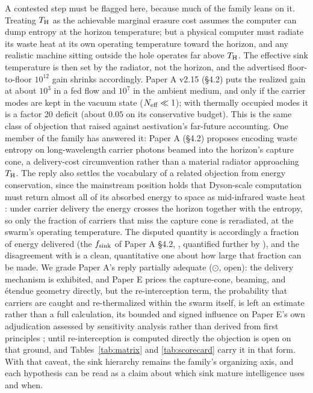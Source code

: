 \documentclass[11pt]{article}
\newcommand{\shalf}{\ensuremath{\odot}} %
\begin{document}
A contested step must be flagged here, because much of the family leans on it. Treating $T_{\rm H}$ as the achievable marginal erasure cost assumes the computer can dump entropy at the horizon temperature; but a physical computer must radiate its waste heat at its own operating temperature toward the horizon, and any realistic machine sitting outside the hole operates far above $T_{\rm H}$. The effective sink temperature is then set by the radiator, not the horizon, and the advertised floor-to-floor $10^{12}$ gain shrinks accordingly. Paper A v2.15 (\S4.2) puts the realized gain at about $10^{3}$ in a fed flow and $10^{7}$ in the ambient medium, and only if the carrier modes are kept in the vacuum state ($N_{\rm eff}\ll1$); with thermally occupied modes it is a factor 20 deficit (about $0.05$ on its conservative budget). This is the same class of objection that \citet{Bennett2019} raised against aestivation's far-future accounting. One member of the family has answered it: Paper A (\S4.2) proposes encoding waste entropy on long-wavelength carrier photons beamed into the horizon's capture cone, a delivery-cost circumvention rather than a material radiator approaching $T_{\rm H}$. The reply also settles the vocabulary of a related objection from energy conservation, since the mainstream position holds that Dyson-scale computation must return almost all of its absorbed energy to space as mid-infrared waste heat \citep{Curtis2026DysonMinds}: under carrier delivery the energy crosses the horizon together with the entropy, so only the fraction of carriers that miss the capture cone is reradiated, at the swarm's operating temperature. The disputed quantity is accordingly a fraction of energy delivered (the $f_{\rm sink}$ of Paper A \S4.2, \citealt{Swanson2026MTH}, quantified further by \citealt{Swanson2026Engineered}), and the disagreement with \citet{Curtis2026DysonMinds} is a clean, quantitative one about how large that fraction can be made. We grade Paper A's reply partially adequate (\shalf, open): the delivery mechanism is exhibited, and Paper E prices the capture-cone, beaming, and \'etendue geometry directly, but the re-interception term, the probability that carriers are caught and re-thermalized within the swarm itself, is left an estimate rather than a full calculation, its bounded and signed influence on Paper E's own adjudication assessed by sensitivity analysis rather than derived from first principles \citep{Swanson2026Engineered}; until re-interception is computed directly the objection is open on that ground, and Tables~\ref{tab:matrix} and \ref{tab:scorecard} carry it in that form. With that caveat, the sink hierarchy remains the family's organizing axis, and each hypothesis can be read as a claim about which sink mature intelligence uses and when.
\end{document}
